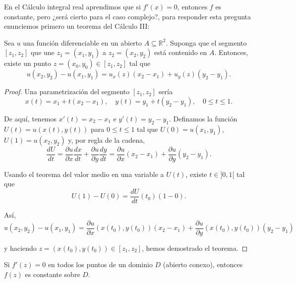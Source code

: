 En el Cálculo integral real aprendimos que si $f'(x) = 0$, entonces $f$ es constante, pero ¿será cierto para el caso complejo?, para responder esta pregunta enunciemos primero un teorema del Cálculo III:

\begin{teorema}
Sea $u$ una función diferenciable en un abierto $A \subseteq \mathbb{R}^2$. Suponga que el segmento $[z_1,z_2]$ que une $z_1 = (x_1,y_1)$ a $z_2 = (x_2,y_2)$ está contenido en $A$. Entonces, existe un punto $z = (x_0,y_0) \in [z_1,z_2]$ tal que
$$u(x_2,y_2) - u(x_1,y_1) = u_x(z) (x_2-x_1) + u_y(z) (y_2-y_1).$$
\end{teorema}

\begin{proof}
Una parametrización del segmento $[z_1,z_2]$ sería
$$x(t) = x_1 + t(x_2-x_1), \quad y(t) = y_1 + t(y_2-y_1), \quad 0 \leq t \leq 1.$$

De aquí, tenemos $x'(t) = x_2-x_1$ e $y'(t) = y_2-y_1$. Definamos la función $U(t) = u(x(t),y(t))$ para $0 \leq t \leq 1$ tal que $U(0) = u(x_1,y_1)$, $U(1) = u(x_2,y_2)$ y, por regla de la cadena,
$$\frac{d U}{dt} = \frac{\partial u}{\partial x}\frac{dx}{dt} + \frac{\partial u}{\partial y}\frac{dy}{dt} = \frac{\partial u}{\partial x}(x_2-x_1)+ \frac{\partial u}{\partial y}(y_2-y_1).$$

Usando el teorema del valor medio en una variable a $U(t)$, existe $t \in ]0,1[$ tal que
$$U(1) - U(0) = \frac{dU}{dt}(t_0) (1-0).$$

Así,
$$u(x_2,y_2) - u(x_1,y_1) = \frac{\partial u}{\partial x}(x(t_0),y(t_0)) (x_2-x_1) + \frac{\partial u}{\partial y}(x(t_0),y(t_0)) (y_2-y_1)$$

y haciendo $z = (x(t_0),y(t_0)) \in [z_1,z_2]$, hemos demostrado el teorema.

\end{proof}

\begin{teorema}
Si $f'(z) = 0$ en todos los puntos de un dominio $D$ (abierto conexo), entonces $f(z)$ es constante sobre $D$.
\end{teorema}

